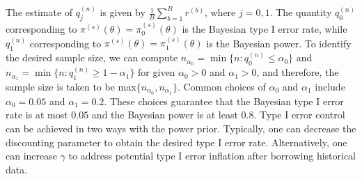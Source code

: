 The estimate of $q_j^{(n)}$ is given by $\frac{1}{B}\sum_{b=1}^B r^{(b)}$, where $j=0,1$. The quantity $q_{0}^{(n)}$ corresponding to $\pi^{(s)}(\theta)=\pi_0^{(s)}(\theta)$ is the Bayesian type I error rate, while $q_{1}^{(n)}$ corresponding to $\pi^{(s)}(\theta)=\pi_1^{(s)}(\theta)$ is the Bayesian power.
To identify the desired sample size, we can compute $n_{\alpha_0} = \min\{n: q_{0}^{(n)} \le \alpha_0\}$ and $n_{\alpha_1} = \min\{n: q_{1}^{(n)} \ge 1-\alpha_1\}$ for given $\alpha_0 > 0$ and $\alpha_1 > 0$, and therefore, the sample size is taken to be max$\{n_{\alpha_0}, n_{\alpha_1}\}$. Common choices of $\alpha_0$ and $\alpha_1$ include $\alpha_0=0.05$ and $\alpha_1=0.2$. These choices guarantee that the Bayesian type I error rate is at most $0.05$ and the Bayesian power is at least $0.8$. Type I error control can be achieved in two ways with the power prior. Typically, one can decrease the discounting parameter to obtain the desired type I error rate. Alternatively, one can increase $\gamma$ to address potential type I error inflation after borrowing historical data.

